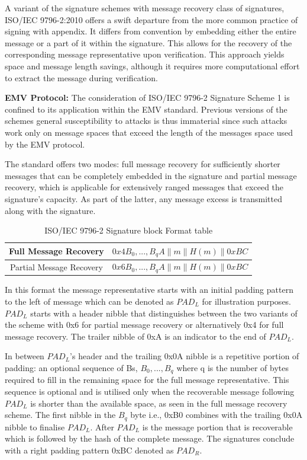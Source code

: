 \documentclass[]{final_report}
\theoremstyle{definition}
\begin{document}
A variant of the signature schemes with message recovery class of signatures, ISO/IEC 9796-2:2010 offers a swift departure from the more common practice of signing with appendix. It differs from convention by embedding either the entire message or a part of it within the signature. This allows for the recovery of the corresponding message representative upon verification. This approach yields space and message length savings, although it requires more computational effort to extract the message during verification.

\textbf{EMV Protocol:} The consideration of ISO/IEC 9796-2 Signature Scheme 1 is confined to its application within the EMV standard. Previous versions of the schemes general susceptibility to attacks \cite{10.1007/3-540-48405-1_1, coron2016practical} is thus immaterial since such attacks work only on message spaces that exceed the length of the messages space used by the EMV protocol.

The standard offers two modes: full message recovery for sufficiently shorter messages that can be completely embedded in the signature and partial message recovery, which is applicable for extensively ranged messages that exceed the signature's capacity. As part of the latter, any message excess is transmitted along with the signature.

\begin{table}[H]
    \centering
    \caption{ISO/IEC 9796-2 Signature block Format table}
    \begin{tabular}{|c|c|}
    \hline
    Full Message Recovery & $0x4B_{0},...,B_{q}A\|m\|H(m)\|0xBC$ \\
    \hline
    Partial Message Recovery & $0x6B_{0},...,B_{q}A\|m\|H(m)\|0xBC$ \\
    \hline
    \end{tabular}
    \label{tab:sig_block_tab}
\end{table}
In this format the message representative starts with an initial padding pattern to the left of message which can be denoted as $PAD_L$ for illustration purposes. $PAD_L$ starts with a header nibble that distinguishes between the two variants of the scheme with 0x6 for partial message recovery or alternatively 0x4 for full message recovery. The trailer nibble of 0xA is an indicator to the end of $PAD_L$. 

In between $PAD_L$'s header and the trailing 0x0A nibble is a repetitive portion of padding: an optional sequence of Bs, $B_{0},...,B_{q}$ where q is the number of bytes required to fill in the remaining space for the full message representative. This sequence is optional and is utilised only when the recoverable message following $PAD_L$ is shorter than the available space, as seen in the full message recovery scheme. The first nibble in the $B_{q}$ byte i.e., 0xB0 combines with the trailing 0x0A nibble to finalise $PAD_L$.
After $PAD_L$ is the message portion that is recoverable which is followed by the hash of the complete message. The signatures conclude with a right padding pattern 0xBC denoted as $PAD_R$.
\end{document}
